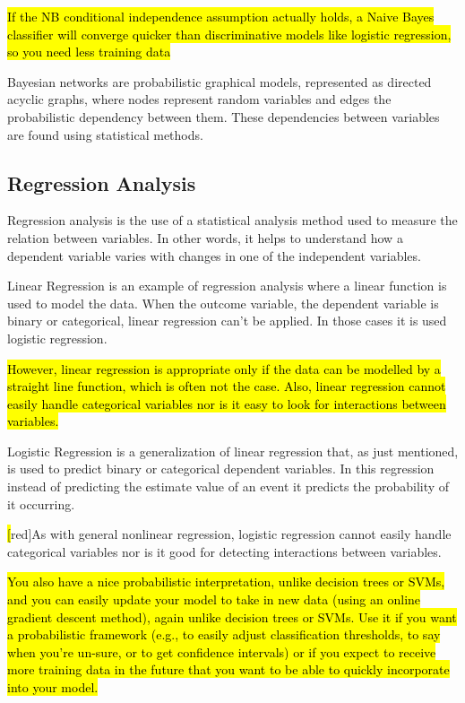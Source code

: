 \hl{If the NB conditional independence assumption actually holds, a Naive Bayes classifier will converge quicker than
 discriminative models like logistic regression, so you need less training data}

Bayesian networks are probabilistic graphical models, represented as directed acyclic graphs, where nodes represent random 
variables and edges the probabilistic dependency between them. These dependencies between variables are found using statistical methods. 

\subsection{Regression Analysis}
\label{subsection:regression}

Regression analysis is the use of a statistical analysis method used to measure the relation between variables. In other words, it helps to
 understand how a dependent variable varies with changes in one of the independent variables. 

Linear Regression is an example of regression analysis where a linear function is used to model the data. When the outcome variable,
 the dependent variable is binary or categorical, linear regression can’t be applied. In those cases it is used logistic regression.

 \hl{However, linear regression is appropriate only if the data can be modelled by a straight line function, which is often not 
the case. Also, linear regression cannot easily handle categorical variables nor is it easy to look for interactions between variables.}

Logistic Regression is a generalization of linear regression that, as just mentioned, is used to predict binary or categorical dependent
 variables. In this regression instead of predicting the estimate value of an event it predicts the probability of it occurring.

 \hl[red]{As with general nonlinear regression, logistic regression cannot easily handle categorical variables nor is it good for detecting
 interactions between variables.}

 \hl{You also have a nice probabilistic interpretation, unlike decision trees or SVMs, and you can easily update your model to take
 in new data (using an online gradient descent method), again unlike decision trees or SVMs. Use it if you want a probabilistic framework
 (e.g., to easily adjust classification thresholds, to say when you're un-sure, or to get confidence intervals) or if you expect to receive 
 more training data in the future that you want to be able to quickly incorporate into your model.}

